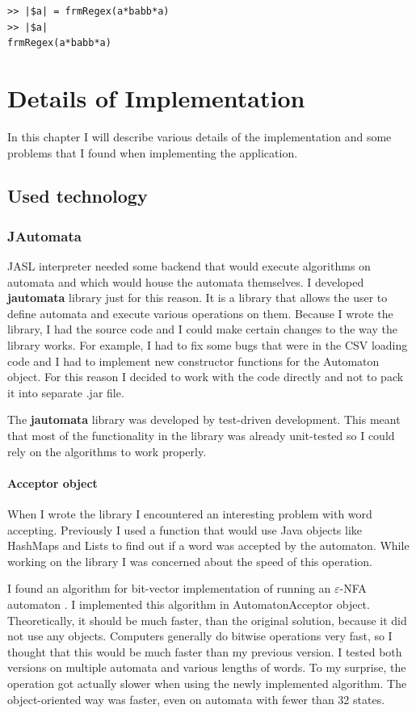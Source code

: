 \documentclass{ctuthesis}
\begin{document}
\begin{minipage}{\linewidth}
\begin{lstlisting}[language = JASL_snippet]
>> |$a| = frmRegex(a*babb*a)
>> |$a|
frmRegex(a*babb*a)
\end{lstlisting}
\end{minipage}

\chapter{Details of Implementation}
In this chapter I will describe various details of the implementation and some problems that I found when implementing the application.

\section{Used technology}
\subsection{JAutomata}
JASL interpreter needed some backend that would execute algorithms on automata and which would house the automata themselves. I developed \textbf{jautomata} library just for this reason. It is a library that allows the user to define automata and execute various operations on them. Because I wrote the library, I had the source code and I could make certain changes to the way the library works. For example, I had to fix some bugs that were in the CSV loading code and I had to implement new constructor functions for the Automaton object. For this reason I decided to work with the code directly and not to pack it into separate .jar file. 

The \textbf{jautomata} library was developed by test-driven development. This meant that most of the functionality in the library was already unit-tested so I could rely on the algorithms to work properly. 

\subsubsection{Acceptor object}
When I wrote the library I encountered an interesting problem with word accepting. Previously I used a function that would use Java objects like HashMaps and Lists to find out if a word was accepted by the automaton. While working on the library I was concerned about the speed of this operation. 

I found an algorithm for bit-vector implementation of running an $\varepsilon$-NFA automaton \cite{acceptor-algorithm}. I implemented this algorithm in AutomatonAcceptor object. Theoretically, it should be much faster, than the original solution, because it did not use any objects. Computers generally do bitwise operations very fast, so I thought that this would be much faster than my previous version. I tested both versions on multiple automata and various lengths of words. To my surprise, the operation got actually slower when using the newly implemented algorithm. The object-oriented way was faster, even on automata with fewer than 32 states. 
\end{document}
